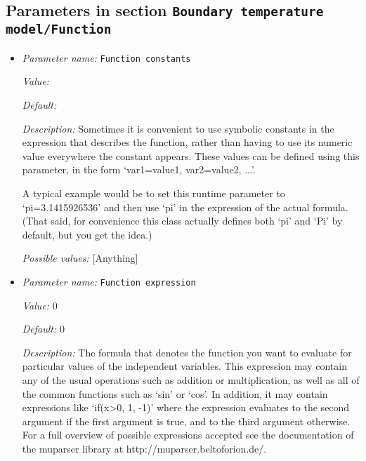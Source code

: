 \subsection{Parameters in section \tt Boundary temperature model/Function}
\label{parameters:Boundary_20temperature_20model/Function}

\begin{itemize}
\item {\it Parameter name:} {\tt Function constants}
\label{parameters:Boundary temperature model/Function/Function constants}


{\it Value:} 


{\it Default:} 


{\it Description:} Sometimes it is convenient to use symbolic constants in the expression that describes the function, rather than having to use its numeric value everywhere the constant appears. These values can be defined using this parameter, in the form `var1=value1, var2=value2, ...'.

A typical example would be to set this runtime parameter to `pi=3.1415926536' and then use `pi' in the expression of the actual formula. (That said, for convenience this class actually defines both `pi' and `Pi' by default, but you get the idea.)


{\it Possible values:} [Anything]
\item {\it Parameter name:} {\tt Function expression}
\label{parameters:Boundary temperature model/Function/Function expression}


{\it Value:} 0


{\it Default:} 0


{\it Description:} The formula that denotes the function you want to evaluate for particular values of the independent variables. This expression may contain any of the usual operations such as addition or multiplication, as well as all of the common functions such as `sin' or `cos'. In addition, it may contain expressions like `if(x>0, 1, -1)' where the expression evaluates to the second argument if the first argument is true, and to the third argument otherwise. For a full overview of possible expressions accepted see the documentation of the muparser library at http://muparser.beltoforion.de/.


\end{itemize}
